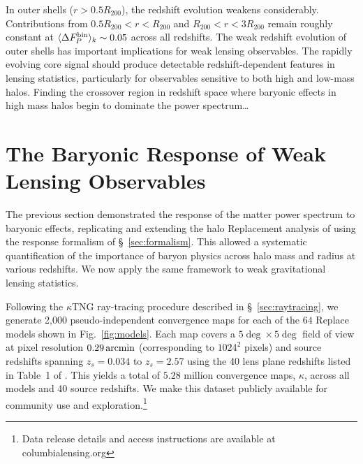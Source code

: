 \documentclass[linenumbers,trackchanges]{aastex701}
\begin{document}
In outer shells ($r > 0.5R_{200}$), the redshift evolution weakens considerably. Contributions from $0.5R_{200} < r < R_{200}$ and $R_{200} < r < 3R_{200}$ remain roughly constant at $\langle \Delta F_P^{\rm bin} \rangle_k \sim 0.05$ across all redshifts. The weak redshift evolution of outer shells has important implications for weak lensing observables. The rapidly evolving core signal should produce detectable redshift-dependent features in lensing statistics, particularly for observables sensitive to both high and low-mass halos. Finding the crossover region in redshift space where baryonic effects in high mass halos begin to dominate the power spectrum…

\section{The Baryonic Response of Weak Lensing Observables}
\label{sec:results_WL}
The previous section demonstrated the response of the matter power spectrum to baryonic effects, replicating and extending the halo Replacement analysis of \citet{Miller-25} using the response formalism of \S~\ref{sec:formalism}. This allowed a systematic quantification of the importance of baryon physics across halo mass and radius at various redshifts. We now apply the same framework to weak gravitational lensing statistics.

Following the $\kappa$TNG ray-tracing procedure described in \S~\ref{sec:raytracing}, we generate 2,000 pseudo-independent convergence maps for each of the $ 64$ Replace models shown in Fig.~\ref{fig:models}. Each map covers a $5\deg \times 5\deg$ field of view at pixel resolution $0.29\,{\rm arcmin}$ (corresponding to $1024^2$ pixels) and source redshifts spanning $z_s = 0.034$ to $z_s = 2.57$ using the 40 lens plane redshifts listed in Table~1 of \citet{Osato21}. This yields a total of $5.28$ million convergence maps, $\kappa$, across all models and 40 source redshifts. We make this dataset publicly available for community use and exploration.\footnote{Data release details and access instructions are available at columbialensing.org}
\end{document}
